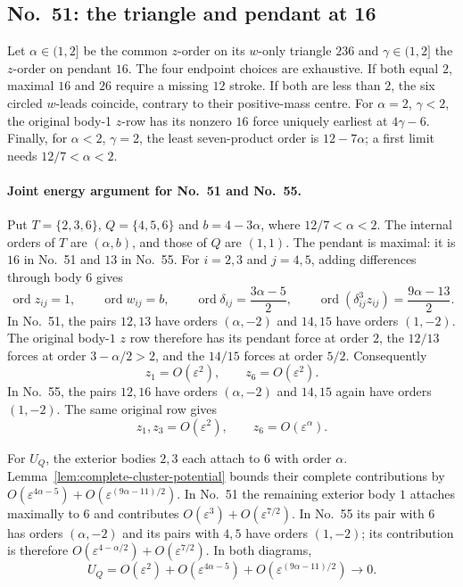 \documentclass[11pt]{amsart}
\theoremstyle{remark}
\newcommand{\ord}{\operatorname{ord}}
\begin{document}
\subsection{No.~51: the triangle and pendant at 16}\label{sec:no51-pendant}
Let $\alpha\in(1,2]$ be the common $z$-order on its $w$-only triangle $236$ and $\gamma\in(1,2]$ the $z$-order on pendant $16$. The four endpoint choices are exhaustive. If both equal $2$, maximal $16$ and $26$ require a missing $12$ stroke. If both are less than $2$, the six circled $w$-leads coincide, contrary to their positive-mass centre. For $\alpha=2$, $\gamma<2$, the original body-1 $z$-row has its nonzero $16$ force uniquely earliest at $4\gamma-6$. Finally, for $\alpha<2$, $\gamma=2$, the least seven-product order is $12-7\alpha$; a first limit needs $12/7<\alpha<2$.

\paragraph{Joint energy argument for No.~51 and No.~55.}
Put $T=\{2,3,6\}$, $Q=\{4,5,6\}$ and $b=4-3\alpha$, where
$12/7<\alpha<2$. The internal orders of $T$ are $(\alpha,b)$, and those of $Q$ are $(1,1)$. The pendant is maximal: it is $16$ in No.~51 and $13$ in No.~55.
For $i=2,3$ and $j=4,5$, adding differences through body $6$ gives
\begin{equation}\label{eq:overlap-cross-orders}
 \ord z_{ij}=1,\qquad \ord w_{ij}=b,\qquad
 \ord\delta_{ij}=\frac{3\alpha-5}{2},\qquad
 \ord(\delta_{ij}^3z_{ij})=\frac{9\alpha-13}{2}.
\end{equation}
In No.~51, the pairs $12,13$ have orders $(\alpha,-2)$ and $14,15$ have orders $(1,-2)$. The original body-$1$ $z$ row therefore has its pendant force at order $2$, the $12/13$ forces at order $3-\alpha/2>2$, and the $14/15$ forces at order $5/2$. Consequently
\begin{equation}\label{eq:no51-reference-centre}
 z_1=O(\varepsilon^2),\qquad z_6=O(\varepsilon^2).
\end{equation}
In No.~55, the pairs $12,16$ have orders $(\alpha,-2)$ and $14,15$ again have orders $(1,-2)$. The same original row gives
\begin{equation}\label{eq:no55-reference-centre}
 z_1,z_3=O(\varepsilon^2),\qquad z_6=O(\varepsilon^\alpha).
\end{equation}

For $U_Q$, the exterior bodies $2,3$ each attach to $6$ with order $\alpha$.
Lemma~\ref{lem:complete-cluster-potential} bounds their complete contributions by
$O(\varepsilon^{4\alpha-5})+O(\varepsilon^{(9\alpha-11)/2})$.
In No.~51 the remaining exterior body $1$ attaches maximally to $6$ and contributes $O(\varepsilon^3)+O(\varepsilon^{7/2})$.
In No.~55 its pair with $6$ has orders $(\alpha,-2)$ and its pairs with $4,5$ have orders $(1,-2)$; its contribution is therefore
$O(\varepsilon^{4-\alpha/2})+O(\varepsilon^{7/2})$.
In both diagrams,
\begin{equation}\label{eq:overlap-inner-potential}
 U_Q=O(\varepsilon^2)+O(\varepsilon^{4\alpha-5})
     +O(\varepsilon^{(9\alpha-11)/2})\longrightarrow0.
\end{equation}
\end{document}
